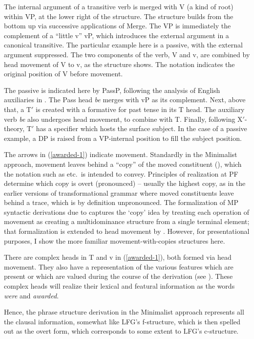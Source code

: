 \documentclass[output=paper,hidelinks]{langscibook}
\begin{document}
The internal argument of a transitive verb is merged with V (a kind of
root) within VP, at the lower right of the structure. The structure
builds from the bottom up via successive applications of Merge. The VP is
immediately the complement of a ``little v'' vP, which introduces the
external argument in a canonical transitive. The particular example
here is a passive, with the external argument suppressed. The two
components of the verb, V and v, are combined by head movement of V to
v, as the structure shows. The notation  indicates the
original position of V before movement.

The passive is indicated here by PassP, following the analysis of
English auxiliaries in \citet{adger03}. The Pass head {\it be\/}
merges with vP as its complement. Next, above that, a T$'$ is created
with a formative for past tense in its T head. The auxiliary verb {\it
  be\/} also undergoes head movement, to combine with T. Finally,
following X$'$-theory, T$'$ has a specifier which hosts the surface
subject. In the case of a passive example, a DP is raised from a
VP-internal position to fill the subject position.

The arrows in (\ref{awarded-1}) indicate movement. Standardly in the
Minimalist approach, movement leaves behind a ``copy'' of the moved
constituent (\citealp{chomsky1995the-minimalist}), which the notation
such as  etc.\ is intended to convey. Principles of
realization at PF determine which copy is overt (pronounced) --
usually the highest copy, as in the earlier versions of
transformational grammar where moved constituents leave behind a
trace, which is by definition unpronounced. The formalization of MP
syntactic derivations due to \citet{collstab16} captures the `copy'
idea by treating each operation of movement as creating a
multidominance structure from a single terminal element; that
formalization is extended to head movement by
\citet{bleaman21}. However, for presentational purposes, I show the
more familiar movement-with-copies structures here.

There are complex heads in T and v in (\ref{awarded-1}), both formed via head
movement. They also have a representation of the various features
which are present or which are valued during the course of the
derivation (see ). These complex heads
will realize their lexical and featural information as the words {\it
  were\/} and {\it awarded\/}.

Hence, the phrase structure derivation in the Minimalist approach
represents all the clausal information, somewhat like LFG's
f-structure, which is then spelled out as the overt form, which
corresponds to some extent to LFG's c-structure.
\end{document}
